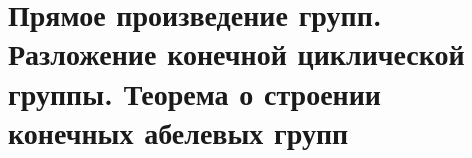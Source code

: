 \section{Прямое произведение групп. Разложение конечной циклической группы. Теорема о строении конечных абелевых групп}
